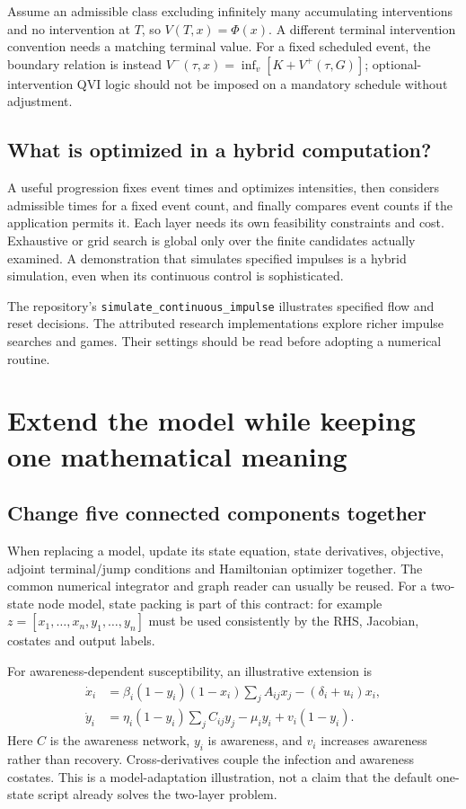 \documentclass[11pt,a4paper]{article}
\theoremstyle{definition}
\theoremstyle{remark}
\begin{document}
Assume an admissible class excluding infinitely many accumulating interventions and no intervention at $T$, so $V(T,x)=\Phi(x)$. A different terminal intervention convention needs a matching terminal value. For a fixed scheduled event, the boundary relation is instead
$V^-(\tau,x)=\inf_v[K+V^+(\tau,G)]$; optional-intervention QVI logic should not be imposed on a mandatory schedule without adjustment.

\subsection{What is optimized in a hybrid computation?}
A useful progression fixes event times and optimizes intensities, then considers admissible times for a fixed event count, and finally compares event counts if the application permits it. Each layer needs its own feasibility constraints and cost. Exhaustive or grid search is global only over the finite candidates actually examined. A demonstration that simulates specified impulses is a hybrid simulation, even when its continuous control is sophisticated.

The repository's \texttt{simulate\_continuous\_impulse} illustrates specified flow and reset decisions. The attributed research implementations explore richer impulse searches and games. Their settings should be read before adopting a numerical routine.

\section{Extend the model while keeping one mathematical meaning}
\subsection{Change five connected components together}
When replacing a model, update its state equation, state derivatives, objective, adjoint terminal/jump conditions and Hamiltonian optimizer together. The common numerical integrator and graph reader can usually be reused. For a two-state node model, state packing is part of this contract: for example $z=[x_1,\ldots,x_n,y_1,\ldots,y_n]$ must be used consistently by the RHS, Jacobian, costates and output labels.

For awareness-dependent susceptibility, an illustrative extension is
\begin{align}
\dot x_i&=\beta_i(1-y_i)(1-x_i)\sum_jA_{ij}x_j-(\delta_i+u_i)x_i,\nonumber\\
\dot y_i&=\eta_i(1-y_i)\sum_jC_{ij}y_j-\mu_i y_i+v_i(1-y_i).
\end{align}
Here $C$ is the awareness network, $y_i$ is awareness, and $v_i$ increases awareness rather than recovery. Cross-derivatives couple the infection and awareness costates. This is a model-adaptation illustration, not a claim that the default one-state script already solves the two-layer problem.
\end{document}
